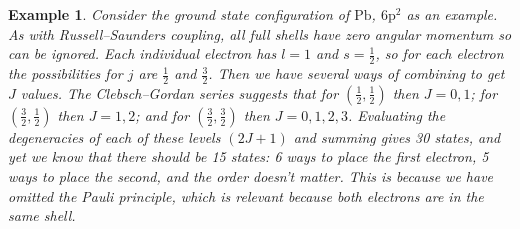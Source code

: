 \documentclass{article}
\theoremstyle{plain}\theoremheaderfont{\normalfont\itshape}\theorembodyfont{\rmfamily}\theoremseparator{.}\newtheorem*{rem}{Remark}\newtheorem*{ex}{Example}\newtheorem*{proof}{Proof}\newtheorem*{altp}{Alternative proof}
\theoremstyle{plain}\theoremheaderfont{\normalfont\bfseries}\theorembodyfont{\rmfamily}\theoremseparator{.}\newtheorem{thm}{Theorem}[section]\newtheorem{lem}[thm]{Lemma}\newtheorem{prop}[thm]{Proposition}\newtheorem*{cor}{Corollary}\newtheorem{defn}[thm]{Definition}\newtheorem{clm}[thm]{Claim}\newtheorem{clminproof}{Claim}
\theoremstyle{break}\theoremheaderfont{\normalfont\itshape}\theorembodyfont{\rmfamily}\theoremseparator{.\medskip}\newtheorem*{proofskip}{Proof}\newtheorem*{exs}{Examples}\newtheorem*{rems}{Remarks}
\theoremstyle{break}\theoremheaderfont{\normalfont\bfseries}\theorembodyfont{\rmfamily}\theoremseparator{.\medskip}\newtheorem{lemskip}[thm]{Lemma}\newtheorem{defnskip}[thm]{Definition}\newtheorem{propskip}[thm]{Proposition}\newtheorem{thmskip}[thm]{Theorem}
\numberwithin{equation}{section}
\begin{document}
    \begin{ex}
        Consider the ground state configuration of \(\mathrm{Pb}\), \(\mathrm{6p^2}\) as an example. As with Russell--Saunders coupling, all full shells have zero angular momentum so can be ignored. Each individual electron has \(l=1\) and \(s=\frac{1}{2}\), so for each electron the possibilities for \(j\) are \(\frac{1}{2}\) and \(\frac{3}{2}\). Then we have several ways of combining to get \(J\) values. The Clebsch--Gordan series suggests that for \((\frac{1}{2},\frac{1}{2})\) then \(J=0,1\); for \((\frac{3}{2},\frac{1}{2})\) then \(J=1,2\); and for \((\frac{3}{2},\frac{3}{2})\) then \(J=0,1,2,3\). Evaluating the degeneracies of each of these levels \((2J+1)\) and summing gives 30 states, and yet we know that there should be 15 states: 6 ways to place the first electron, 5 ways to place the second, and the order doesn't matter. This is because we have omitted the Pauli principle, which is relevant because both electrons are in the same shell.


\end{ex}
\end{document}

